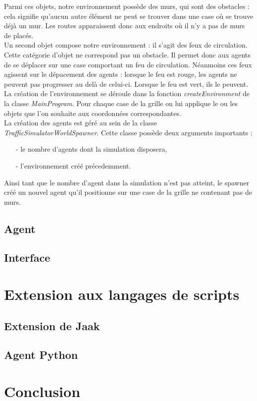 \documentclass[a4paper,12pt]{report}
\begin{document}
Parmi ces objets, notre environnement possède des murs, qui sont des obstacles : cela signifie qu'aucun autre élément ne peut se trouver dans une case où se trouve déjà un mur. Les routes apparaissent donc aux endroits où il n'y a pas de murs de placés. \\

Un second objet compose notre environnement : il s'agit des feux de circulation. Cette catégorie d'objet ne correspond pas un obstacle. Il permet donc aux agents de se déplacer sur une case comportant un feu de circulation. Néanmoins ces feux agissent sur le dépacement des agents : lorsque le feu est rouge, les agents ne peuvent pas progresser au delà de celui-ci. Lorsque le feu est vert, ils le peuvent. \\

La création de l'environnement se déroule dans la fonction \emph{createEnvironment} de la classe \emph{MainProgram}. Pour chaque case de la grille on lui applique le ou les objets que l'on souhaite aux coordonnées correspondantes. \\

La création des agents est géré au sein de la classe \emph{TrafficSimulatorWorldSpawner}. Cette classe possède deux arguments importants : 
\begin{itemize}
\item[-] le nombre d'agents dont la simulation disposera,
\item[-] l'environnement créé précedemment.
\end{itemize}

Ainsi tant que le nombre d'agent dans la simulation n'est pas atteint, le spawner créé un nouvel agent qu'il positionne sur une case de la grille ne contenant pas de murs.

\section{Agent}



\section{Interface}

\chapter{Extension aux langages de scripts}

\section{Extension de Jaak}

\section{Agent Python}

\chapter{Conclusion}
\end{document}
